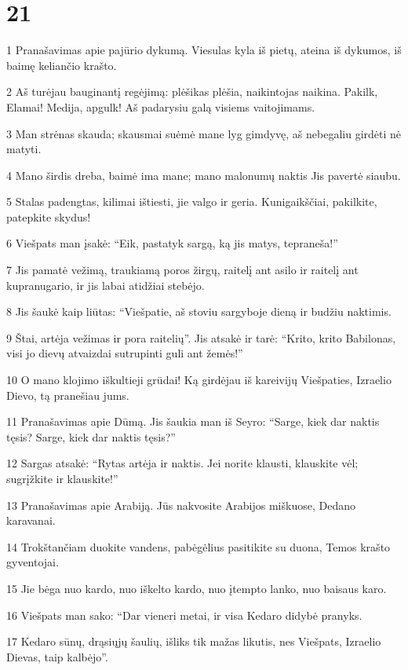 \chapter{21}


\par 1 Pranašavimas apie pajūrio dykumą. Viesulas kyla iš pietų, ateina iš dykumos, iš baimę keliančio krašto. 
\par 2 Aš turėjau bauginantį regėjimą: plėšikas plėšia, naikintojas naikina. Pakilk, Elamai! Medija, apgulk! Aš padarysiu galą visiems vaitojimams. 
\par 3 Man strėnas skauda; skausmai suėmė mane lyg gimdyvę, aš nebegaliu girdėti nė matyti. 
\par 4 Mano širdis dreba, baimė ima mane; mano malonumų naktis Jis pavertė siaubu. 
\par 5 Stalas padengtas, kilimai ištiesti, jie valgo ir geria. Kunigaikščiai, pakilkite, patepkite skydus! 
\par 6 Viešpats man įsakė: “Eik, pastatyk sargą, ką jis matys, tepraneša!” 
\par 7 Jis pamatė vežimą, traukiamą poros žirgų, raitelį ant asilo ir raitelį ant kupranugario, ir jis labai atidžiai stebėjo. 
\par 8 Jis šaukė kaip liūtas: “Viešpatie, aš stoviu sargyboje dieną ir budžiu naktimis. 
\par 9 Štai, artėja vežimas ir pora raitelių”. Jis atsakė ir tarė: “Krito, krito Babilonas, visi jo dievų atvaizdai sutrupinti guli ant žemės!” 
\par 10 O mano klojimo iškultieji grūdai! Ką girdėjau iš kareivijų Viešpaties, Izraelio Dievo, tą pranešiau jums. 
\par 11 Pranašavimas apie Dūmą. Jis šaukia man iš Seyro: “Sarge, kiek dar naktis tęsis? Sarge, kiek dar naktis tęsis?” 
\par 12 Sargas atsakė: “Rytas artėja ir naktis. Jei norite klausti, klauskite vėl; sugrįžkite ir klauskite!” 
\par 13 Pranašavimas apie Arabiją. Jūs nakvosite Arabijos miškuose, Dedano karavanai. 
\par 14 Trokštančiam duokite vandens, pabėgėlius pasitikite su duona, Temos krašto gyventojai. 
\par 15 Jie bėga nuo kardo, nuo iškelto kardo, nuo įtempto lanko, nuo baisaus karo. 
\par 16 Viešpats man sako: “Dar vieneri metai, ir visa Kedaro didybė pranyks. 
\par 17 Kedaro sūnų, drąsiųjų šaulių, išliks tik mažas likutis, nes Viešpats, Izraelio Dievas, taip kalbėjo”.



